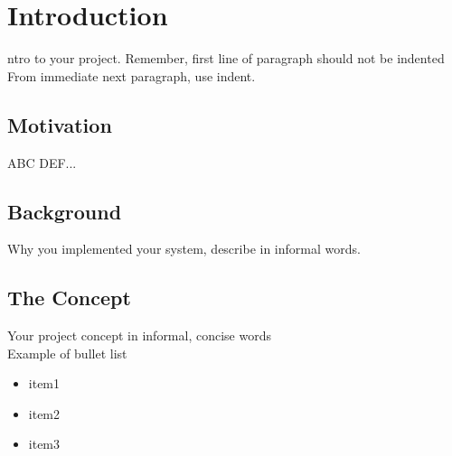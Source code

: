 \chapter{Introduction}
ntro to your project. Remember, first line of paragraph should not be indented\\
\indent From immediate next paragraph, use indent.

\section{Motivation}
\noindent ABC DEF...

\section{Background}
\noindent Why you implemented your system, describe in informal words.

\section{The Concept}
Your project concept in informal, concise words\\
Example of bullet list
\begin{itemize}\itemsep-5pt
\item item1
\item item2
\item item3
\end{itemize} 

